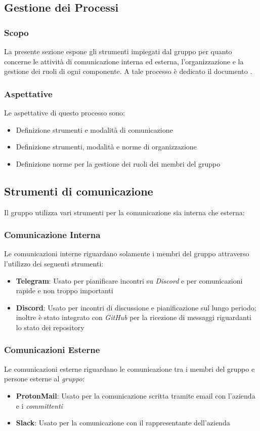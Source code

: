 \subsection{Gestione dei Processi} %
\subsubsection{Scopo}
La presente sezione espone gli strumenti impiegati dal gruppo \teamname{} per quanto concerne le attività di comunicazione interna ed esterna, l'organizzazione e la gestione dei ruoli di ogni componente.
A tale processo è dedicato il documento \PdP{}.

\subsubsection{Aspettative}
Le aspettative di questo processo sono:
\begin{itemize}
	\item Definizione strumenti e modalità di comunicazione
	\item Definizione strumenti, modalità e norme di organizzazione
	\item Definizione norme per la gestione dei ruoli dei membri del gruppo
\end{itemize}

\subsection{Strumenti di comunicazione}
Il gruppo \teamname{} utilizza vari strumenti per la comunicazione sia interna che esterna:
	\subsubsection{Comunicazione Interna}
		Le comunicazioni interne riguardano solamente i membri del gruppo \teamname{} attraverso l'utilizzo dei seguenti strumenti:
			\begin{itemize}
				\item \textbf{Telegram}: Usato per pianificare incontri su \emph{Discord} e per comunicazioni rapide e non troppo importanti
				\item \textbf{Discord}: Usato per incontri di discussione e pianificazione sul lungo periodo; inoltre è stato integrato con \emph{GitHub} per la ricezione di messaggi riguardanti lo stato dei repository
			\end{itemize}
	\subsubsection{Comunicazioni Esterne}
	\label{sec:Comunicazioni Esterne}
		Le comunicazioni esterne riguardano le comunicazione tra i membri del gruppo \teamname e persone esterne al \emph{gruppo}:
			\begin{itemize}
				\item \textbf{ProtonMail}: Usato per la comunicazione scritta tramite email con l'azienda \proponente e i \emph{committenti}
				\item \textbf{Slack}: Usato per la comunicazione con il rappresentante dell'azienda \proponente
			\end{itemize}
		
